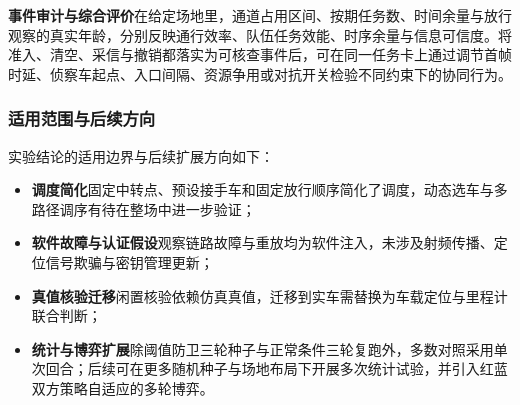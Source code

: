\noindent\textbf{事件审计与综合评价}\quad 在给定场地里，通道占用区间、按期任务数、时间余量与放行观察的真实年龄，分别反映通行效率、队伍任务效能、时序余量与信息可信度。将准入、清空、采信与撤销都落实为可核查事件后，可在同一任务卡上通过调节首帧时延、侦察车起点、入口间隔、资源争用或对抗开关检验不同约束下的协同行为。

\subsubsection*{适用范围与后续方向}

实验结论的适用边界与后续扩展方向如下：
\begin{itemize}
\item \textbf{调度简化}\quad 固定中转点、预设接手车和固定放行顺序简化了调度，动态选车与多路径调序有待在整场中进一步验证；
\item \textbf{软件故障与认证假设}\quad 观察链路故障与重放均为软件注入，未涉及射频传播、定位信号欺骗与密钥管理更新；
\item \textbf{真值核验迁移}\quad 闲置核验依赖仿真真值，迁移到实车需替换为车载定位与里程计联合判断；
\item \textbf{统计与博弈扩展}\quad 除阈值防卫三轮种子与正常条件三轮复跑外，多数对照采用单次回合；后续可在更多随机种子与场地布局下开展多次统计试验，并引入红蓝双方策略自适应的多轮博弈。
\end{itemize}

